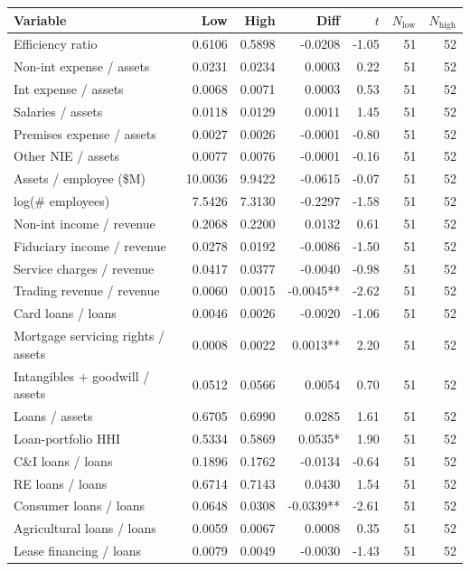 \begin{tabular}{lrrrrrr}
\toprule
Variable & Low & High & Diff & $t$ & $N_{\text{low}}$ & $N_{\text{high}}$ \\
\midrule
Efficiency ratio & 0.6106 & 0.5898 & -0.0208 & -1.05 & 51 & 52 \\
Non-int expense / assets & 0.0231 & 0.0234 & 0.0003 & 0.22 & 51 & 52 \\
Int expense / assets & 0.0068 & 0.0071 & 0.0003 & 0.53 & 51 & 52 \\
Salaries / assets & 0.0118 & 0.0129 & 0.0011 & 1.45 & 51 & 52 \\
Premises expense / assets & 0.0027 & 0.0026 & -0.0001 & -0.80 & 51 & 52 \\
Other NIE / assets & 0.0077 & 0.0076 & -0.0001 & -0.16 & 51 & 52 \\
Assets / employee (\$M) & 10.0036 & 9.9422 & -0.0615 & -0.07 & 51 & 52 \\
log(\# employees) & 7.5426 & 7.3130 & -0.2297 & -1.58 & 51 & 52 \\
Non-int income / revenue & 0.2068 & 0.2200 & 0.0132 & 0.61 & 51 & 52 \\
Fiduciary income / revenue & 0.0278 & 0.0192 & -0.0086 & -1.50 & 51 & 52 \\
Service charges / revenue & 0.0417 & 0.0377 & -0.0040 & -0.98 & 51 & 52 \\
Trading revenue / revenue & 0.0060 & 0.0015 & -0.0045** & -2.62 & 51 & 52 \\
Card loans / loans & 0.0046 & 0.0026 & -0.0020 & -1.06 & 51 & 52 \\
Mortgage servicing rights / assets & 0.0008 & 0.0022 & 0.0013** & 2.20 & 51 & 52 \\
Intangibles + goodwill / assets & 0.0512 & 0.0566 & 0.0054 & 0.70 & 51 & 52 \\
Loans / assets & 0.6705 & 0.6990 & 0.0285 & 1.61 & 51 & 52 \\
Loan-portfolio HHI & 0.5334 & 0.5869 & 0.0535* & 1.90 & 51 & 52 \\
C\&I loans / loans & 0.1896 & 0.1762 & -0.0134 & -0.64 & 51 & 52 \\
RE loans / loans & 0.6714 & 0.7143 & 0.0430 & 1.54 & 51 & 52 \\
Consumer loans / loans & 0.0648 & 0.0308 & -0.0339** & -2.61 & 51 & 52 \\
Agricultural loans / loans & 0.0059 & 0.0067 & 0.0008 & 0.35 & 51 & 52 \\
Lease financing / loans & 0.0079 & 0.0049 & -0.0030 & -1.43 & 51 & 52 \\

\end{tabular}
